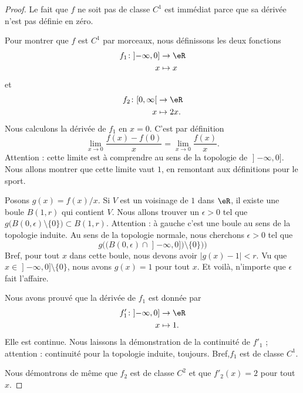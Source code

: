 \begin{proof}
	Le fait que \( f\) ne soit pas de classe \( C^1\) est immédiat parce que sa dérivée n'est pas définie en zéro.

	Pour montrer que \( f\) est \( C^1\) par morceaux, nous définissons les deux fonctions
	\begin{equation}
		\begin{aligned}
			f_1\colon \mathopen] -\infty,0\mathclose] & \to \eR   \\
			x                                         & \mapsto x
		\end{aligned}
	\end{equation}
	et
	\begin{equation}
		\begin{aligned}
			f_2\colon \mathopen[ 0,\infty\mathclose[ & \to \eR     \\
			x                                        & \mapsto 2x.
		\end{aligned}
	\end{equation}
	Nous calculons la dérivée de \( f_1\) en \( x=0\). C'est par définition
	\begin{equation}
		\lim_{x\to 0} \frac{ f(x)-f(0) }{ x }=\lim_{x\to 0} \frac{ f(x) }{ x }.
	\end{equation}
	Attention : cette limite est à comprendre au sens de la topologie de \( \mathopen] -\infty,0\mathclose]\). Nous allons montrer que cette limite vaut \( 1\), en remontant aux définitions pour le sport.

	Posons \( g(x)=f(x)/x\). Si \( V\) est un voisinage de \( 1\) dans \( \eR\), il existe une boule \( B(1,r)\) qui contient \( V\). Nous allons trouver un \( \epsilon>0\) tel que \( g\big( B(0,\epsilon)\setminus \{ 0 \} \big)\subset B(1,r)\). Attention : à gauche c'est une boule au sens de la topologie induite. Au sens de la topologie normale, nous cherchons \( \epsilon>0\) tel que
	\begin{equation}
		g\Big(\big( B(0,\epsilon)\cap\mathopen] -\infty,0\mathclose] \big)\setminus\{ 0 \})\Big)
	\end{equation}
	Bref, pour tout \( x\) dans cette boule, nous devons avoir \(  | g(x)-1 |<r  \). Vu que \( x\in\mathopen] -\infty,0\mathclose]\setminus\{ 0 \}\), nous avons \( g(x)=1\) pour tout \( x\). Et voilà, n'importe que \( \epsilon\) fait l'affaire.

	Nous avons prouvé que la dérivée de \( f_1\) est donnée par
	\begin{equation}
		\begin{aligned}
			f_1'\colon \mathopen] -\infty,0\mathclose] & \to \eR    \\
			x                                          & \mapsto 1.
		\end{aligned}
	\end{equation}
	Elle est continue. Nous laissons la démonstration de la continuité de \( f'_1\) ; attention : continuité pour la topologie induite, toujours. Bref,\( f_1\) est de classe \( C^1\).

	Nous démontrons de même que \( f_2\) est de classe \( C^2\) et que \( f'_2(x)=2\) pour tout \( x\).
\end{proof}

